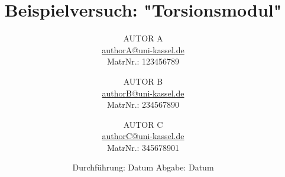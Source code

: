 

\author{%
  AUTOR A\\%
  \href{mailto:authorA@uni-kassel.de}{authorA@uni-kassel.de}\\%
  MatrNr.: 123456789\\%
  \and%
  AUTOR B\\%
  \href{mailto:authorB@uni-kassel.de}{authorB@uni-kassel.de}\\%
  MatrNr.: 234567890\\%
  \and%
  AUTOR C\\%
  \href{mailto:authorC@uni-kassel.de}{authorC@uni-kassel.de}\\%
  MatrNr.: 345678901\\%
}
\publishers{Universität Kassel – Institut für Physik und CINSaT}

\subject{V0}
\title{Beispielversuch: "Torsionsmodul"}
\date{%
  Durchführung: Datum
  \hspace{3em}
  Abgabe: Datum
}



\maketitle
\thispagestyle{empty}
\tableofcontents
\newpage






\printbibliography{}


